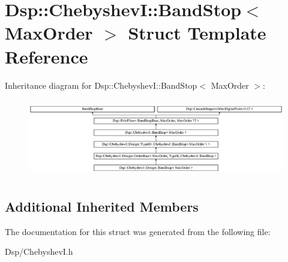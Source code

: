 \hypertarget{structDsp_1_1ChebyshevI_1_1BandStop}{\section{Dsp\-:\-:Chebyshev\-I\-:\-:Band\-Stop$<$ Max\-Order $>$ Struct Template Reference}
\label{structDsp_1_1ChebyshevI_1_1BandStop}
}
Inheritance diagram for Dsp\-:\-:Chebyshev\-I\-:\-:Band\-Stop$<$ Max\-Order $>$\-:\begin{figure}[H]
\begin{center}
\leavevmode
\includegraphics[height=3.435583cm]{structDsp_1_1ChebyshevI_1_1BandStop}
\end{center}
\end{figure}
\subsection*{Additional Inherited Members}


The documentation for this struct was generated from the following file\-:\begin{DoxyCompactItemize}
\item 
Dsp/Chebyshev\-I.\-h\end{DoxyCompactItemize}
